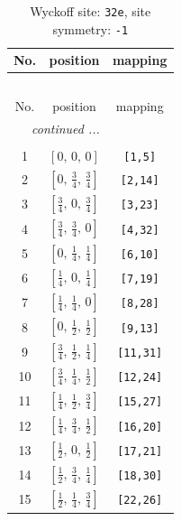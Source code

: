\documentclass[fleqn,8pt]{jsarticle}
\begin{document}
\renewcommand{\arraystretch}{1.2}
\begin{longtable}{ccc}
\caption{Wyckoff site: {\tt 32e}, site symmetry: {\tt -1}}
 \\
 \hline \hline
No. & position & mapping \\ \hline \endfirsthead

\multicolumn{2}{l}{\tablename\ \thetable{}} \\
 \hline \hline
No. & position & mapping \\ \hline \endhead

 \hline \hline
\multicolumn{2}{r}{\footnotesize\it continued ...} \\ \endfoot

 \hline \hline
\multicolumn{2}{r}{} \\ \endlastfoot

1 & $\left[ 0,\, 0,\, 0 \right]$ & {\tt [1,5]} \\ \hline
2 & $\left[ 0,\, \frac{3}{4},\, \frac{3}{4} \right]$ & {\tt [2,14]} \\ \hline
3 & $\left[ \frac{3}{4},\, 0,\, \frac{3}{4} \right]$ & {\tt [3,23]} \\ \hline
4 & $\left[ \frac{3}{4},\, \frac{3}{4},\, 0 \right]$ & {\tt [4,32]} \\ \hline
5 & $\left[ 0,\, \frac{1}{4},\, \frac{1}{4} \right]$ & {\tt [6,10]} \\ \hline
6 & $\left[ \frac{1}{4},\, 0,\, \frac{1}{4} \right]$ & {\tt [7,19]} \\ \hline
7 & $\left[ \frac{1}{4},\, \frac{1}{4},\, 0 \right]$ & {\tt [8,28]} \\ \hline
8 & $\left[ 0,\, \frac{1}{2},\, \frac{1}{2} \right]$ & {\tt [9,13]} \\ \hline
9 & $\left[ \frac{3}{4},\, \frac{1}{2},\, \frac{1}{4} \right]$ & {\tt [11,31]} \\ \hline
10 & $\left[ \frac{3}{4},\, \frac{1}{4},\, \frac{1}{2} \right]$ & {\tt [12,24]} \\ \hline
11 & $\left[ \frac{1}{4},\, \frac{1}{2},\, \frac{3}{4} \right]$ & {\tt [15,27]} \\ \hline
12 & $\left[ \frac{1}{4},\, \frac{3}{4},\, \frac{1}{2} \right]$ & {\tt [16,20]} \\ \hline
13 & $\left[ \frac{1}{2},\, 0,\, \frac{1}{2} \right]$ & {\tt [17,21]} \\ \hline
14 & $\left[ \frac{1}{2},\, \frac{3}{4},\, \frac{1}{4} \right]$ & {\tt [18,30]} \\ \hline
15 & $\left[ \frac{1}{2},\, \frac{1}{4},\, \frac{3}{4} \right]$ & {\tt [22,26]} \\ \hline

\end{longtable}
\end{document}
